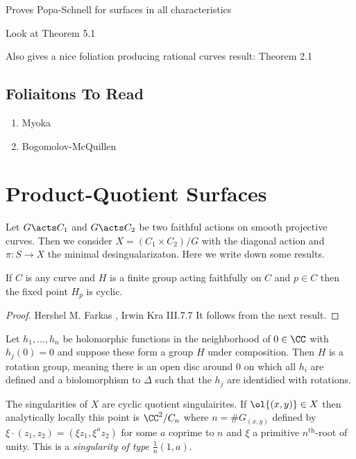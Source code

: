 \documentclass[12pt]{article}
\begin{document}
Proves Popa-Schnell for surfaces in all characteristics


Look at Theorem 5.1

Also gives a nice foliation producing rational curves result: Theorem 2.1

\subsection{Foliaitons To Read}

\begin{enumerate}
\item Myoka
\item Bogomolov-McQuillen
\end{enumerate}

\section{Product-Quotient Surfaces}

Let $G \acts C_1$ and $G \acts C_2$ be two faithful actions on smooth projective curves. Then we consider $X = (C_1 \times C_2) / G$ with the diagonal action and $\pi : S \to X$ the minimal desingualarizaton. Here we write down some results.

\begin{prop}
If $C$ is any curve and $H$ is a finite group acting faithfully on $C$ and $p \in C$ then the fixed point $H_p$ is cyclic. 
\end{prop}

\begin{proof}
 Hershel M. Farkas , Irwin Kra III.7.7 It follows from the next result.
\end{proof}

\begin{prop}
Let $h_1, \dots, h_n$ be holomorphic functions in the neighborhood of $0 \in \CC$ with $h_j(0) = 0$ and suppose these form a group $H$ under composition. Then $H$ is a rotation group, meaning there is an open disc around $0$ on which all $h_i$ are defined and a biolomorphism to $\Delta$ such that the $h_j$ are identidied with rotations. 
\end{prop}

\begin{cor}
The singularities of $X$ are cyclic quotient singulairites. If $\ol{(x,y)} \in X$ then analytically locally this point is $\CC^2 / C_n$ where $n = \# G_{(x,y)}$ defined by $\xi \cdot (z_1, z_2) = (\xi z_1, \xi^a z_2)$ for some $a$ coprime to $n$ and $\xi$ a primitive $n^{\text{th}}$-root of unity. This is a \textit{singularity of type} $\frac{1}{n}(1,a)$.
\end{cor}
\end{document}
